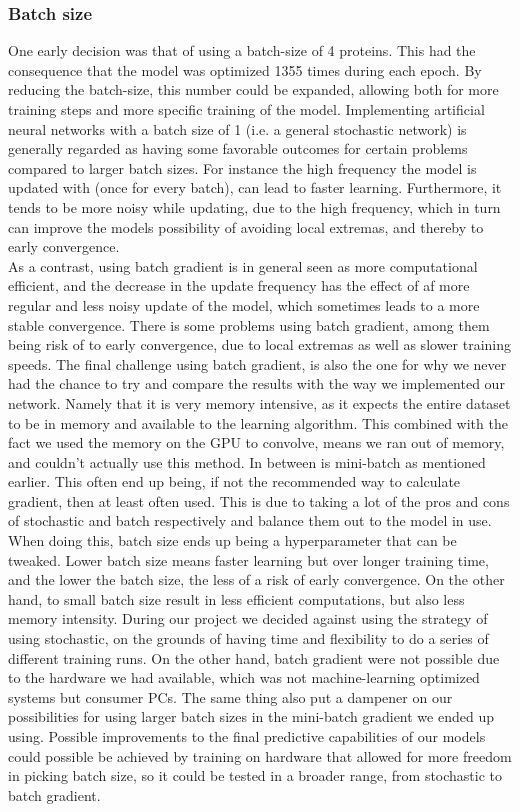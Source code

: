 \subsubsection{Batch size}
 One early decision was that of using a batch-size of 4 proteins. This had the consequence that the model was optimized 1355 times during each epoch. By reducing the batch-size, this number could be expanded, allowing both for more training steps and more specific training of the model. Implementing artificial neural networks with a batch size of 1 (i.e. a general stochastic network) is generally regarded as having some favorable outcomes for certain problems compared to larger batch sizes. For instance the high frequency the model is updated with (once for every batch), can lead to faster learning. Furthermore, it tends to be more noisy while updating, due to the high frequency, which in turn can improve the models possibility of avoiding local extremas, and thereby to early convergence.\\ 
  As a contrast, using batch gradient is in general seen as more computational efficient, and the decrease in the update frequency has the effect of af more regular and less noisy update of the model, which sometimes leads to a more stable convergence. There is some problems using batch gradient, among them being risk of to early convergence, due to local extremas as well as slower training speeds. The final challenge using batch gradient, is also the one for why we never had the chance to try and compare the results with the way we implemented our network. Namely that it is very memory intensive, as it expects the entire dataset to be in memory and available to the learning algorithm. This combined with the fact we used the memory on the GPU to convolve, means we ran out of memory, and couldn't actually use this method. In between is mini-batch as mentioned earlier. This often end up being, if not the recommended way to calculate gradient, then at least often used. This is due to taking a lot of the pros and cons of stochastic and batch respectively and balance them out to the model in use. When doing this, batch size ends up being a hyperparameter that can be tweaked. Lower batch size means faster learning but over longer training time, and the lower the batch size, the less of a risk of early convergence. On the other hand, to small batch size result in less efficient computations, but also less memory intensity. During our project we decided against using the strategy of using stochastic, on the grounds of having time and flexibility to do a series of different training runs. On the other hand, batch gradient were not possible due to the hardware we had available, which was not machine-learning optimized systems but consumer PCs. The same thing also put a dampener on our possibilities for using larger batch sizes in the mini-batch gradient we ended up using. Possible improvements to the final predictive capabilities of our models could possible be achieved by training on hardware that allowed for more freedom in picking batch size, so it could be tested in a broader range, from stochastic to batch gradient.\\ 
